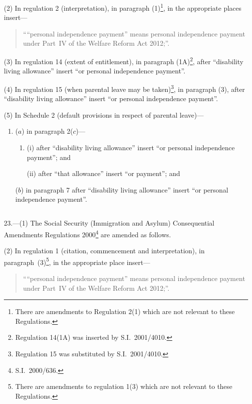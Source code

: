 \documentclass[12pt,a4paper]{article}
\begin{document}
(2) In regulation 2 (interpretation), in paragraph (1)\footnote{There are amendments to Regulation 2(1) which are not relevant to these Regulations.}, in the appropriate places insert—
\begin{quotation}
““personal independence payment” means personal independence payment under Part~IV of the Welfare Reform Act 2012;”.
\end{quotation}

(3) In regulation 14 (extent of entitlement), in paragraph (1A)\footnote{Regulation 14(1A) was inserted by S.I.~2001/4010.}, after “disability living allowance” insert “or personal independence payment”.

(4) In regulation 15 (when parental leave may be taken)\footnote{Regulation 15 was substituted by S.I.~2001/4010.}, in paragraph (3), after “disability living allowance” insert “or personal independence payment”.

(5) In Schedule 2 (default provisions in respect of parental leave)—
\begin{enumerate}\item[]
($a$) in paragraph 2($c$)—
\begin{enumerate}\item[]
(i) after “disability living allowance” insert “or personal independence payment”; and

(ii) after “that allowance” insert “or payment”; and
\end{enumerate}

($b$) in paragraph 7 after “disability living allowance” insert “or personal independence payment”.
\end{enumerate}

\subsection*{\itshape{}}

23.—(1) The Social Security (Immigration and Asylum) Consequential Amendments Regulations 2000\footnote{S.I.~2000/636.} are amended as follows.

(2) In regulation 1 (citation, commencement and interpretation), in paragraph~(3)\footnote{There are amendments to regulation 1(3) which are not relevant to these Regulations.}, in the appropriate place insert—
\begin{quotation}
““personal independence payment” means personal independence payment under Part~IV of the Welfare Reform Act 2012;”.
\end{quotation}
\end{document}

